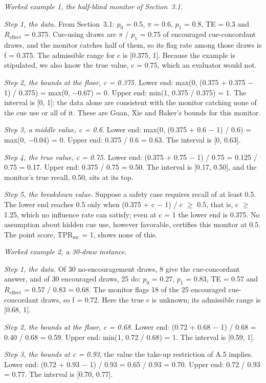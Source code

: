 \documentclass[11pt,a4paper]{article}
\begin{document}
\emph{Worked example 1, the half-blind monitor of Section~3.1.}

\emph{Step 1, the data.} From Section~3.1: $p_0$ = 0.5, $\pi$ = 0.6, $p_1$ = 0.8, TE = 0.3 and $R_{\mathrm{effect}}$ = 0.375. Cue-using draws are $\pi$ / $p_1$ = 0.75 of encouraged cue-concordant draws, and the monitor catches half of them, so its flag rate among those draws is f = 0.375. The admissible range for c is [0.375, 1]. Because the example is stipulated, we also know the true value, c = 0.75, which an evaluator would not.

\emph{Step 2, the bounds at the floor, c = 0.375.} Lower end: max(0, (0.375 + 0.375 $-$ 1) / 0.375) = max(0, $-$0.67) = 0. Upper end: min(1, 0.375 / 0.375) = 1. The interval is [0, 1]: the data alone are consistent with the monitor catching none of the cue use or all of it. These are Guan, Xie and Baker's bounds for this monitor.

\emph{Step 3, a middle value, c = 0.6.} Lower end: max(0, (0.375 + 0.6 $-$ 1) / 0.6) = max(0, $-$0.04) = 0. Upper end: 0.375 / 0.6 = 0.63. The interval is [0, 0.63].

\emph{Step 4, the true value, c = 0.75.} Lower end: (0.375 + 0.75 $-$ 1) / 0.75 = 0.125 / 0.75 = 0.17. Upper end: 0.375 / 0.75 = 0.50. The interval is [0.17, 0.50], and the monitor's true recall, 0.50, sits at its top.

\emph{Step 5, the breakdown value.} Suppose a safety case requires recall of at least 0.5. The lower end reaches 0.5 only when (0.375 + c $-$ 1) / c $\geq$ 0.5, that is, c $\geq$ 1.25, which no influence rate can satisfy; even at c = 1 the lower end is 0.375. No assumption about hidden cue use, however favorable, certifies this monitor at 0.5. The point score, $\mathrm{TPR}_{\mathrm{mc}}$ = 1, shows none of this.

\emph{Worked example 2, a 30-draw instance.}

\emph{Step 1, the data.} Of 30 no-encouragement draws, 8 give the cue-concordant answer, and of 30 encouraged draws, 25 do: $p_0$ = 0.27, $p_1$ = 0.83, TE = 0.57 and $R_{\mathrm{effect}}$ = 0.57 / 0.83 = 0.68. The monitor flags 18 of the 25 encouraged cue-concordant draws, so f = 0.72. Here the true c is unknown; its admissible range is [0.68, 1].

\emph{Step 2, the bounds at the floor, c = 0.68.} Lower end: (0.72 + 0.68 $-$ 1) / 0.68 = 0.40 / 0.68 = 0.59. Upper end: min(1, 0.72 / 0.68) = 1. The interval is [0.59, 1].

\emph{Step 3, the bounds at c = 0.93}, the value the take-up restriction of A.5 implies. Lower end: (0.72 + 0.93 $-$ 1) / 0.93 = 0.65 / 0.93 = 0.70. Upper end: 0.72 / 0.93 = 0.77. The interval is [0.70, 0.77].
\end{document}
